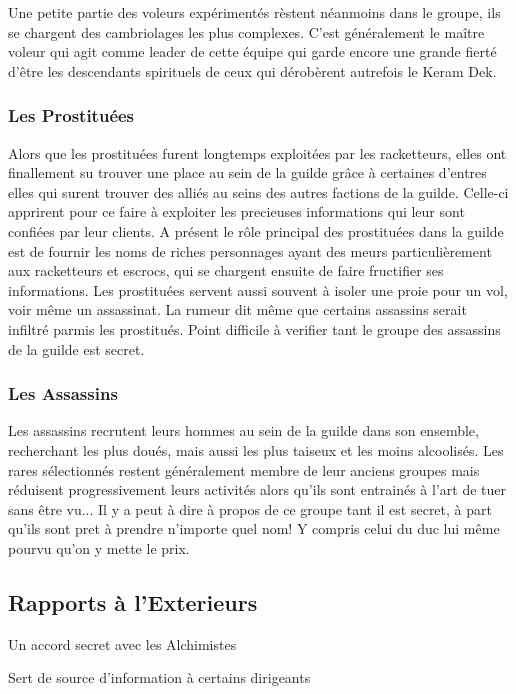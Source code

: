 Une petite partie des voleurs expérimentés rèstent néanmoins dans le groupe,
ils se chargent des cambriolages les plus complexes. C'est généralement le maître
voleur qui agit comme leader de cette équipe qui garde encore une grande fierté
d'être les descendants spirituels de ceux qui dérobèrent autrefois le Keram Dek. 

\subsubsection{Les Prostituées}

Alors que les prostituées furent longtemps exploitées par les racketteurs, elles 
ont finallement su trouver une place au sein de la guilde grâce à certaines d'entres
elles qui surent trouver des alliés au seins des autres factions de la guilde.
Celle-ci apprirent pour ce faire à exploiter les precieuses informations qui leur 
sont confiées par leur clients. A présent le rôle principal des prostituées dans la
guilde est de fournir les noms de riches personnages ayant des meurs particulièrement
aux racketteurs et escrocs, qui se chargent ensuite de faire fructifier ses 
informations. Les prostituées servent aussi souvent à isoler une proie pour un vol, 
voir même un assassinat. La rumeur dit même que certains assassins serait infiltré
parmis les prostitués. Point difficile à verifier tant le groupe des assassins de
la guilde est secret.

\subsubsection{Les Assassins}

Les assassins recrutent leurs hommes au sein de la guilde dans son ensemble,
recherchant les plus doués, mais aussi les plus taiseux et les moins alcoolisés.
Les rares sélectionnés restent généralement membre de leur anciens groupes mais
réduisent progressivement leurs activités alors qu'ils sont entrainés à l'art 
de tuer sans être vu... Il y a peut à dire à propos de ce groupe tant il est 
secret, à part qu'ils sont pret à prendre n'importe quel nom! Y compris celui
du duc lui même pourvu qu'on y mette le prix. 

\subsection{Rapports à l'Exterieurs}

Un accord secret avec les Alchimistes

Sert de source d'information à certains dirigeants

